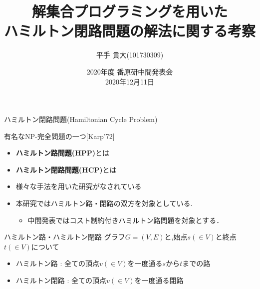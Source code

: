 \documentclass[dvipdfmx,11pt]{beamer}
\title{解集合プログラミングを用いた\\ハミルトン閉路問題の解法に関する考察}
\author{平手 貴大(101730309)}
\institute{名古屋大学情報学部コンピュータ科学科情報システム系\\番原研究室}
\date{2020年度 番原研中間発表会\\2020年12月11日}
\begin{document}
\frame{\maketitle}
\begin{frame}{ハミルトン閉路問題(Hamiltonian Cycle Problem)}
  \begin{alertblock}{}
    \centering
    有名なNP-完全問題の一つ[Karp'72]
  \end{alertblock}

  \begin{itemize}
    \item \alert{\bf ハミルトン路問題(HPP)}とは
    \item \alert{\bf ハミルトン閉路問題(HCP)}とは
    \item 様々な手法を用いた研究がなされている
  \item 本研究ではハミルトン路・閉路の双方を対象としている.
    \begin{itemize}
    \item 中間発表ではコスト制約付きハミルトン路問題を対象とする．
    \end{itemize}
  \end{itemize}
  \begin{block}{ハミルトン路・ハミルトン閉路}
    グラフ$G=(V,E)$と,始点$s(\in V)$と終点$t(\in V)$について
    \begin{itemize}
      \item \small{\alert{ハミルトン路} : 全ての頂点$v(\in V)$を一度通る$s$から$t$までの路}
      \item \small{\alert{ハミルトン閉路} : 全ての頂点$v(\in V)$を一度通る閉路}
    \end{itemize}
  \end{block}
\end{frame}
\end{document}
